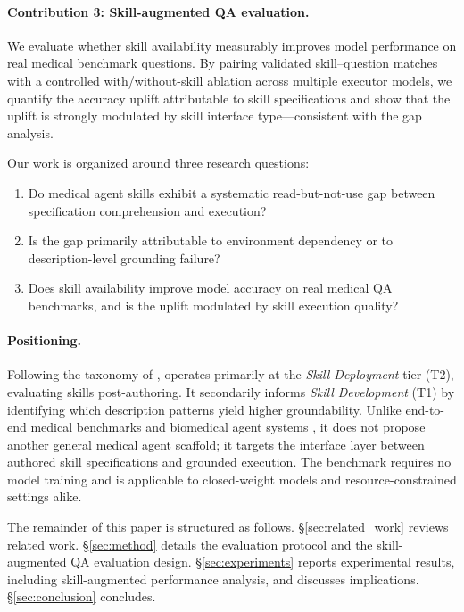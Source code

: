 \paragraph{Contribution 3: Skill-augmented QA evaluation.}
We evaluate whether skill availability measurably improves model performance on real medical benchmark questions.
By pairing validated skill--question matches with a controlled with/without-skill ablation across multiple executor models, we quantify the accuracy uplift attributable to skill specifications and show that the uplift is strongly modulated by skill interface type---consistent with the \rbu gap analysis.

Our work is organized around three research questions:
\begin{enumerate}[nosep,leftmargin=*,label=\textbf{RQ\arabic*:}]
    \item Do medical agent skills exhibit a systematic read-but-not-use gap between specification comprehension and execution?
    \item Is the gap primarily attributable to environment dependency or to description-level grounding failure?
    \item Does skill availability improve model accuracy on real medical QA benchmarks, and is the uplift modulated by skill execution quality?
\end{enumerate}

\paragraph{Positioning.}
Following the taxonomy of \citet{skillsbench2026}, \medskillbench operates primarily at the \emph{Skill Deployment} tier (T2), evaluating skills post-authoring.
It secondarily informs \emph{Skill Development} (T1) by identifying which description patterns yield higher groundability.
Unlike end-to-end medical benchmarks and biomedical agent systems \citep{medagentbench2025,labbench2024,reflectool2025,biomni2025,stella2025}, it does not propose another general medical agent scaffold; it targets the interface layer between authored skill specifications and grounded execution.
The benchmark requires no model training and is applicable to closed-weight models and resource-constrained settings alike.

The remainder of this paper is structured as follows.
\S\ref{sec:related_work} reviews related work.
\S\ref{sec:method} details the \medskillbench evaluation protocol and the skill-augmented QA evaluation design.
\S\ref{sec:experiments} reports experimental results, including skill-augmented performance analysis, and discusses implications.
\S\ref{sec:conclusion} concludes.
